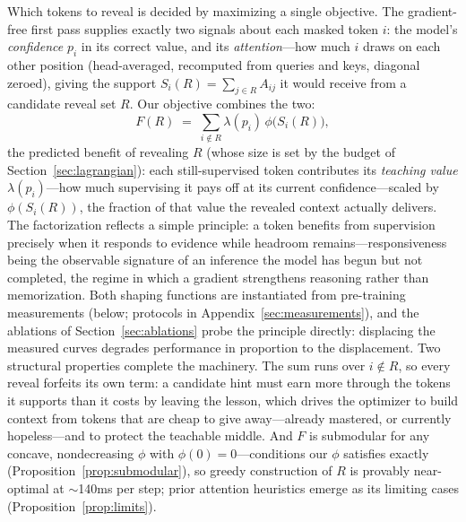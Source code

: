 \documentclass{article} %
\begin{document}
Which tokens to reveal is decided by maximizing a single objective. The gradient-free first pass supplies exactly two signals about each masked token $i$: the model's \emph{confidence} $p_i$ in its correct value, and its \emph{attention}---how much $i$ draws on each other position (head-averaged, recomputed from queries and keys, diagonal zeroed), giving the support $S_i(R) = \sum_{j\in R} A_{ij}$ it would receive from a candidate reveal set $R$. Our objective combines the two:
\begin{equation}
F(R) \;=\; \sum_{i \notin R} \lambda(p_i)\,\phi\big(S_i(R)\big),
\label{eq:objective}
\end{equation}
the predicted benefit of revealing $R$ (whose size is set by the budget of Section~\ref{sec:lagrangian}): each still-supervised token contributes its \emph{teaching value} $\lambda(p_i)$---how much supervising it pays off at its current confidence---scaled by $\phi(S_i(R))$, the fraction of that value the revealed context actually delivers. The factorization reflects a simple principle: a token benefits from supervision precisely when it responds to evidence while headroom remains---responsiveness being the observable signature of an inference the model has begun but not completed, the regime in which a gradient strengthens reasoning rather than memorization. Both shaping functions are instantiated from pre-training measurements (below; protocols in Appendix~\ref{sec:measurements}), and the ablations of Section~\ref{sec:ablations} probe the principle directly: displacing the measured curves degrades performance in proportion to the displacement. Two structural properties complete the machinery. The sum runs over $i \notin R$, so every reveal forfeits its own term: a candidate hint must earn more through the tokens it supports than it costs by leaving the lesson, which drives the optimizer to build context from tokens that are cheap to give away---already mastered, or currently hopeless---and to protect the teachable middle. And $F$ is submodular for any concave, nondecreasing $\phi$ with $\phi(0)=0$---conditions our $\phi$ satisfies exactly (Proposition~\ref{prop:submodular}), so greedy construction of $R$ is provably near-optimal \citep{buchbinder2014submodular} at $\sim$140ms per step; prior attention heuristics emerge as its limiting cases (Proposition~\ref{prop:limits}).
\end{document}
